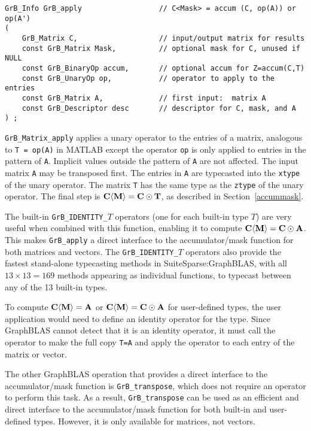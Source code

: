 \documentclass[12pt]{article}
\begin{document}
\begin{mdframed}[userdefinedwidth=6in]
{\footnotesize
\begin{verbatim}
GrB_Info GrB_apply                  // C<Mask> = accum (C, op(A)) or op(A')
(
    GrB_Matrix C,                   // input/output matrix for results
    const GrB_Matrix Mask,          // optional mask for C, unused if NULL
    const GrB_BinaryOp accum,       // optional accum for Z=accum(C,T)
    const GrB_UnaryOp op,           // operator to apply to the entries
    const GrB_Matrix A,             // first input:  matrix A
    const GrB_Descriptor desc       // descriptor for C, mask, and A
) ;
\end{verbatim} } \end{mdframed}

\verb'GrB_Matrix_apply'
applies a unary operator to the entries of a matrix, analogous to
\verb'T = op(A)'  in MATLAB except the operator \verb'op' is only applied to
entries in the pattern of \verb'A'.  Implicit values outside the pattern of
\verb'A' are not affected.  The input matrix \verb'A' may be transposed first.
The entries in \verb'A' are typecasted into the \verb'xtype' of the unary
operator.  The matrix \verb'T' has the same type as the \verb'ztype' of the
unary operator.  The final step is ${\bf C \langle M \rangle  = C \odot T}$, as
described in Section~\ref{accummask}.

The built-in \verb'GrB_IDENTITY_'$T$ operators (one for each built-in type $T$)
are very useful when combined with this function, enabling it to compute ${\bf
C \langle M \rangle  = C \odot A}$.  This makes \verb'GrB_apply' a direct
interface to the accumulator/mask function for both matrices and vectors.
The \verb'GrB_IDENTITY_'$T$ operators also provide the fastest stand-alone
typecasting methods in SuiteSparse:GraphBLAS, with all $13 \times 13=169$
methods appearing as individual functions, to typecast between any of the 13
built-in types.

To compute ${\bf C \langle M \rangle = A}$ or ${\bf C \langle M \rangle = C
\odot A}$ for user-defined types, the user application would need to define an
identity operator for the type.  Since GraphBLAS cannot detect that it is an
identity operator, it must call the operator to make the full copy \verb'T=A'
and apply the operator to each entry of the matrix or vector.

The other GraphBLAS operation that provides a direct interface to the
accumulator/mask function is \verb'GrB_transpose', which does not require an
operator to perform this task.  As a result, \verb'GrB_transpose' can be used
as an efficient and direct interface to the accumulator/mask function for
both built-in and user-defined types.  However, it is only available for
matrices, not vectors.
\end{document}
